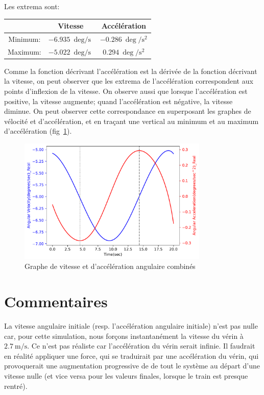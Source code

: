 \documentclass{article}
\begin{document}
Les extrema sont:
\begin{center}
    \begin{tabular}{|c|c|c|}
        \hline
        & Vitesse & Accélération\\
        \hline
        Minimum: & \( \SI{-6,935}{\deg\per\second} \) & \( \SI{-0.286}{\deg\per\second\squared} \)\\
        \hline
        Maximum: & \( \SI{-5.022}{\deg\per\second}\) & \( \SI{0.294}{\deg\per\second\squared} \)\\
        \hline
    \end{tabular}
\end{center}

Comme la fonction décrivant l'accélération est la dérivée de la fonction décrivant la vitesse, on peut observer que les extrema de l'accélération correspondent aux points d'inflexion de la vitesse. On observe aussi que lorsque l'accélération est positive, la vitesse augmente; quand l'accélération est négative, la vitesse diminue. On peut observer cette correspondance en superposant les graphes de vélocité et d'accélération, et en traçant une vertical au minimum et au maximum d'accélération (fig~\ref{fig:combined_vel_accel}).
\begin{figure}[h]
    \centering
    \includegraphics[height=6cm]{data/combined_vel_accel.pdf}
    \caption{Graphe de vitesse et d'accélération angulaire combinés}
    \label{fig:combined_vel_accel}
\end{figure}


\section{Commentaires}
La vitesse angulaire initiale (resp. l'accélération angulaire initiale) n'est pas nulle car, pour cette simulation, nous forçons instantanément la vitesse du vérin à \(\SI{2,7}{\meter\per\second}\). Ce n'est pas réaliste car l'accélération du vérin serait infinie. Il faudrait en réalité appliquer une force, qui se traduirait par une accélération du vérin, qui provoquerait une augmentation progressive de de tout le système au départ d'une vitesse nulle (et vice versa pour les valeurs finales, lorsque le train est presque rentré).
\end{document}
